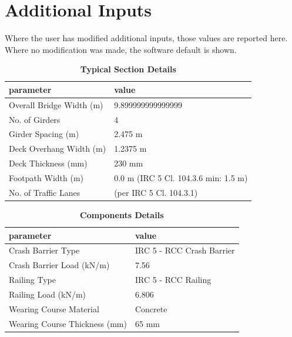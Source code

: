 \documentclass[12pt,a4paper]{report}
\numberwithin{table}{chapter}
\numberwithin{figure}{chapter}
\begin{document}
\newpage
\section{Additional Inputs}
\label{sec:additional-inputs}

Where the user has modified additional inputs, those values are reported here. Where no modification was made, the software default is shown.

\vspace{0.8cm}

\begin{longtable}{|L{5.5cm}|p{10.0cm}|}
\caption{\textbf{Typical Section Details}}
\hline
\textbf{parameter} & \textbf{value} \\
\hline
\textnormal{Overall Bridge Width (m)} & 9.899999999999999 \\[6pt]
\hline
\textnormal{No. of Girders} & 4 \\[6pt]
\hline
\textnormal{Girder Spacing (m)} & 2.475 m \\[6pt]
\hline
\textnormal{Deck Overhang Width (m)} & 1.2375 m \\[6pt]
\hline
\textnormal{Deck Thickness (mm)} & 230 mm \\[6pt]
\hline
\textnormal{Footpath Width (m)} & 0.0 m (IRC 5 Cl. 104.3.6 min: 1.5 m) \\[6pt]
\hline
\textnormal{No. of Traffic Lanes} &  (per IRC 5 Cl. 104.3.1) \\[6pt]
\hline
\end{longtable}

\vspace{0.8em}

\begin{longtable}{|L{5.5cm}|p{10.0cm}|}
\caption{\textbf{Components Details}}
\hline
\textbf{parameter} & \textbf{value} \\
\hline
\textnormal{Crash Barrier Type} & IRC 5 - RCC Crash Barrier \\[6pt]
\hline
\textnormal{Crash Barrier Load (kN/m)} & 7.56 \\[6pt]
\hline

\textnormal{Railing Type} & IRC 5 - RCC Railing \\[6pt]
\hline
\textnormal{Railing Load (kN/m)} & 6.806 \\[6pt]
\hline
\textnormal{Wearing Course Material} & Concrete \\[6pt]
\hline
\textnormal{Wearing Course Thickness (mm)} & 65 mm \\[6pt]
\hline
\end{longtable}
\end{document}

